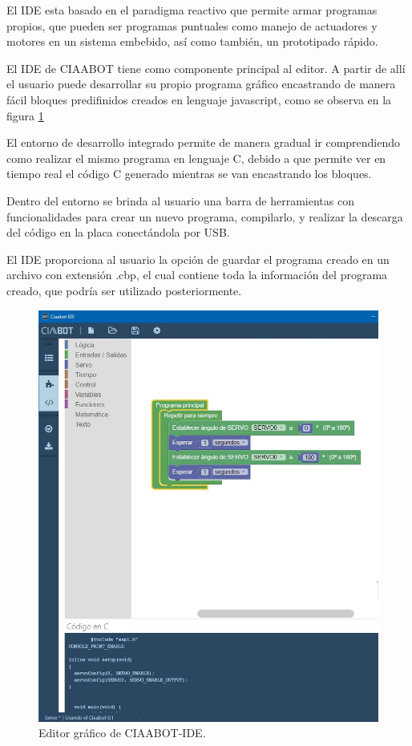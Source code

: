 El IDE esta basado en el paradigma reactivo que permite armar programas propios, que pueden ser programas puntuales como manejo de actuadores y motores
en un sistema embebido, así como también, un prototipado rápido.

El IDE de CIAABOT tiene como componente principal al editor. A partir de allí el usuario puede desarrollar su propio programa gráfico encastrando de manera fácil bloques predifinidos creados en lenguaje javascript, como se observa en la figura \ref{fig:ciaabot-ide-bloques} 

El entorno de desarrollo integrado permite de manera gradual ir comprendiendo como realizar el mismo programa en lenguaje C, debido a que permite ver en tiempo real el código C generado mientras se van encastrando los bloques.

Dentro del entorno se brinda al usuario una barra de herramientas con funcionalidades
para crear un nuevo programa, compilarlo, y realizar la descarga del
código en la placa conectándola por USB.

El IDE proporciona al usuario la opción de guardar el programa creado en un
archivo con extensión .cbp, el cual contiene toda la información del programa
creado, que podría ser utilizado posteriormente. 

\begin{figure}[h]
	\centering
	\includegraphics[scale=.65]{./Figures/ciaabot-ide-bloques.JPG}
	\caption{Editor gráfico de CIAABOT-IDE.}
	\label{fig:ciaabot-ide-bloques}
\end{figure}

